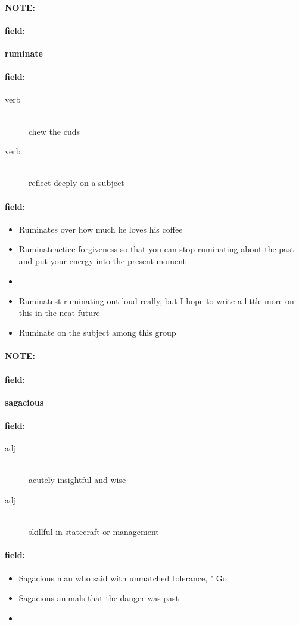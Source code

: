 \documentclass[12pt]{article}
\newenvironment{note}{\paragraph{NOTE:}}{}
\newenvironment{field}{\paragraph{field:}}{}
\begin{document}
\begin{note}
\begin{field}
\textbf{\large ruminate}
\end{field}


\begin{field}
\begin{description}
\item[verb] \hfill \\ 
chew the cuds

\item[verb] \hfill \\ 
reflect deeply on a subject

\end{description}
\end{field}

\begin{field}
\begin{itemize}
\item Ruminates over how much he loves his coffee
\item Ruminateactice forgiveness so that you can stop ruminating about the past and put your energy into the present moment
\item 
\item Ruminatest ruminating out loud really, but I hope to write a little more on this in the neat future
\item Ruminate on the subject among this group
\end{itemize}
\end{field}
\end{note}
\begin{note}
\begin{field}
\textbf{\large sagacious}
\end{field}


\begin{field}
\begin{description}
\item[adj] \hfill \\ 
acutely insightful and wise

\item[adj] \hfill \\ 
skillful in statecraft or management

\end{description}
\end{field}

\begin{field}
\begin{itemize}
\item Sagacious man who said with unmatched tolerance, " Go
\item Sagacious animals that the danger was past
\item 
\end{itemize}
\end{field}
\end{note}
\end{document}
